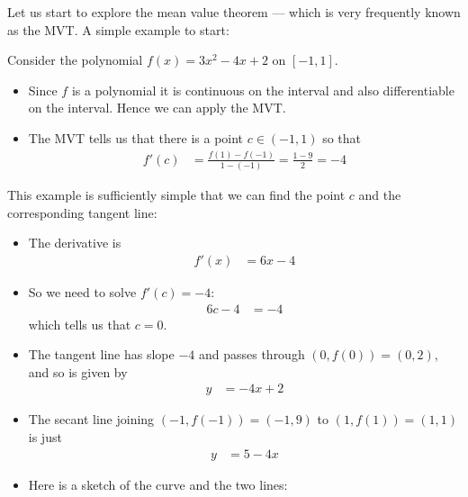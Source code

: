 Let us start to explore the mean value theorem --- which is very frequently known as the
MVT. A simple example to start:
\begin{eg}\label{eg_2_13_3}
Consider the polynomial $f(x)=3x^2-4x+2$ on $[-1,1]$.
\begin{itemize}
 \item Since $f$ is a polynomial it is continuous on the interval and also differentiable
on the interval. Hence we can apply the MVT.
\item The MVT tells us that there is a point $c \in (-1,1)$ so that
\begin{align*}
  f'(c) &= \frac{f(1)-f(-1)}{1-(-1)} = \frac{1-9}{2} =-4
\end{align*}
\end{itemize}
This example is sufficiently simple that we can find the point $c$ and the corresponding
tangent line:
\begin{itemize}
 \item The derivative is
\begin{align*}
  f'(x) &= 6x-4
\end{align*}
\item So we need to solve $f'(c)=-4$:
\begin{align*}
  6c-4 &= -4
\end{align*}
which tells us that $c=0$.
\item The tangent line has slope $-4$ and passes through $(0,f(0))=(0,2)$, and so is
given by
\begin{align*}
  y &= -4x+2
\end{align*}
\item The secant line joining $(-1,f(-1))=(-1,9)$ to $(1,f(1))=(1,1)$ is just
\begin{align*}
  y &= 5-4x
\end{align*}
\item Here is a sketch of the curve and the two lines:
\begin{efig}
\begin{center}
\end{center}
\end{efig}
\end{itemize}

\end{eg}


